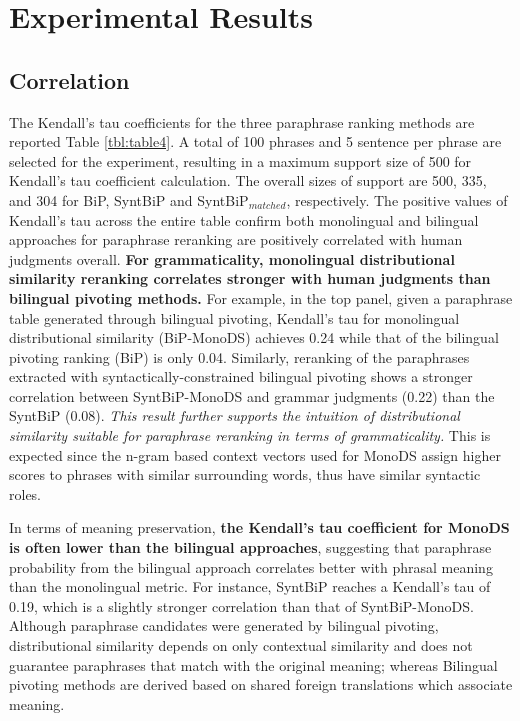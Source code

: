 \documentclass[11pt]{article}
\newcommand{\mnote}[1]{\marginpar{\raggedleft\footnotesize\itshape#1}}
\begin{document}
\section{Experimental Results}
\label{sect:results_fr_en}

\subsection{Correlation}
The Kendall's tau coefficients for the three paraphrase ranking methods are reported Table \ref{tbl:table4}. A total of 100 phrases and 5 sentence per phrase are selected for the experiment, resulting in a maximum support size of 500 for Kendall's tau coefficient calculation. The overall sizes of support are 500, 335, and 304 for BiP, SyntBiP and SyntBiP$_{matched}$, respectively. The positive values of Kendall's tau across the entire table confirm both monolingual and bilingual approaches for paraphrase reranking are positively correlated with human judgments overall. \textbf{For grammaticality, monolingual distributional similarity reranking correlates stronger with human judgments than bilingual pivoting methods.} For example, in the top panel, given a paraphrase table generated through bilingual pivoting, Kendall's tau for monolingual distributional similarity (BiP-MonoDS) achieves 0.24 while that of the bilingual pivoting ranking (BiP) is only 0.04. Similarly, reranking of the paraphrases extracted with syntactically-constrained bilingual pivoting shows a stronger correlation between SyntBiP-MonoDS and grammar judgments (0.22) than the SyntBiP (0.08). \emph{This result further supports the intuition of distributional similarity suitable for paraphrase reranking in terms of grammaticality.} This is expected since the %
n-gram based context vectors used for MonoDS assign higher scores to phrases with similar surrounding words, thus have similar syntactic roles.

In terms of meaning preservation, \textbf{the Kendall's tau coefficient for MonoDS is often lower than the bilingual approaches}, suggesting that paraphrase probability from the bilingual approach correlates better with phrasal meaning than the monolingual metric. For instance, SyntBiP reaches a Kendall's tau of 0.19, which is a slightly stronger correlation than that of SyntBiP-MonoDS. Although paraphrase candidates were generated by bilingual pivoting, distributional similarity depends on only contextual similarity and does not guarantee paraphrases that match with the original meaning; whereas Bilingual pivoting methods are derived based on %
shared foreign translations which associate meaning. 
\end{document}
